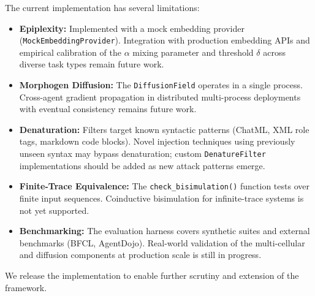 The current implementation has several limitations:

\begin{itemize}[leftmargin=*]
\item \textbf{Epiplexity:} Implemented with a mock embedding provider (\texttt{MockEmbeddingProvider}).
Integration with production embedding APIs and empirical calibration of the $\alpha$ mixing parameter
and threshold $\delta$ across diverse task types remain future work.
\item \textbf{Morphogen Diffusion:} The \texttt{DiffusionField} operates in a single process. Cross-agent
gradient propagation in distributed multi-process deployments with eventual consistency remains future work.
\item \textbf{Denaturation:} Filters target known syntactic patterns (ChatML, XML role tags, markdown
code blocks). Novel injection techniques using previously unseen syntax may bypass denaturation; custom
\texttt{DenatureFilter} implementations should be added as new attack patterns emerge.
\item \textbf{Finite-Trace Equivalence:} The \texttt{check\_bisimulation()} function tests over finite input sequences.
Coinductive bisimulation for infinite-trace systems is not yet supported.
\item \textbf{Benchmarking:} The evaluation harness covers synthetic suites and external benchmarks (BFCL,
AgentDojo). Real-world validation of the multi-cellular and diffusion components at production scale is
still in progress.
\end{itemize}

We release the implementation to enable further scrutiny and extension of the framework.
